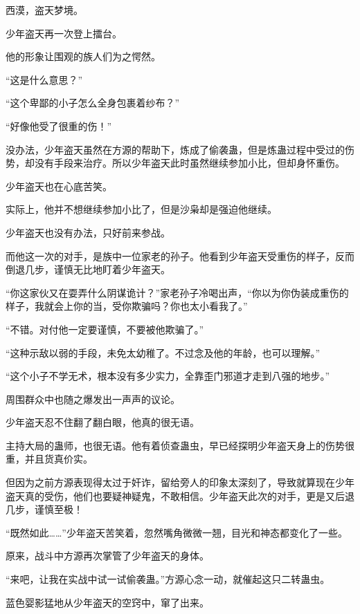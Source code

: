 
\begin{this_body}



西漠，盗天梦境。

少年盗天再一次登上擂台。

他的形象让围观的族人们为之愕然。

“这是什么意思？”

“这个卑鄙的小子怎么全身包裹着纱布？”

“好像他受了很重的伤！”

没办法，少年盗天虽然在方源的帮助下，炼成了偷袭蛊，但是炼蛊过程中受过的伤势，却没有手段来治疗。所以少年盗天此时虽然继续参加小比，但却身怀重伤。

少年盗天也在心底苦笑。

实际上，他并不想继续参加小比了，但是沙枭却是强迫他继续。

少年盗天也没有办法，只好前来参战。

而他这一次的对手，是族中一位家老的孙子。他看到少年盗天受重伤的样子，反而倒退几步，谨慎无比地盯着少年盗天。

“你这家伙又在耍弄什么阴谋诡计？”家老孙子冷喝出声，“你以为你伪装成重伤的样子，我就会上你的当，受你欺骗吗？你也太小看我了。”

“不错。对付他一定要谨慎，不要被他欺骗了。”

“这种示敌以弱的手段，未免太幼稚了。不过念及他的年龄，也可以理解。”

“这个小子不学无术，根本没有多少实力，全靠歪门邪道才走到八强的地步。”

周围群众中也随之爆发出一声声的议论。

少年盗天忍不住翻了翻白眼，他真的很无语。

主持大局的蛊师，也很无语。他有着侦查蛊虫，早已经探明少年盗天身上的伤势很重，并且货真价实。

但因为之前方源表现得太过于奸诈，留给旁人的印象太深刻了，导致就算现在少年盗天真的受伤，他们也要疑神疑鬼，不敢相信。少年盗天此次的对手，更是又后退几步，谨慎至极！

“既然如此……”少年盗天苦笑着，忽然嘴角微微一翘，目光和神态都变化了一些。

原来，战斗中方源再次掌管了少年盗天的身体。

“来吧，让我在实战中试一试偷袭蛊。”方源心念一动，就催起这只二转蛊虫。

蓝色婴影猛地从少年盗天的空窍中，窜了出来。


\end{this_body}
